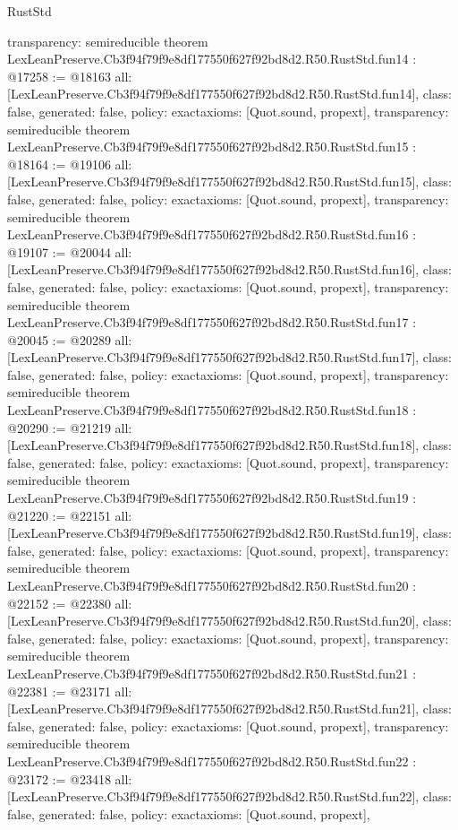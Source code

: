 \begin{lexlean}{RustStd}
\begin{coremodule}
{  transparency: semireducible
}
theorem LexLeanPreserve.Cb3f94f79f9e8df177550f627f92bd8d2.R50.RustStd.fun14 : @17258 := @18163 {
  all: [LexLeanPreserve.Cb3f94f79f9e8df177550f627f92bd8d2.R50.RustStd.fun14],
  class: false,
  generated: false,
  policy: exact{axioms: [Quot.sound, propext]},
  transparency: semireducible
}
theorem LexLeanPreserve.Cb3f94f79f9e8df177550f627f92bd8d2.R50.RustStd.fun15 : @18164 := @19106 {
  all: [LexLeanPreserve.Cb3f94f79f9e8df177550f627f92bd8d2.R50.RustStd.fun15],
  class: false,
  generated: false,
  policy: exact{axioms: [Quot.sound, propext]},
  transparency: semireducible
}
theorem LexLeanPreserve.Cb3f94f79f9e8df177550f627f92bd8d2.R50.RustStd.fun16 : @19107 := @20044 {
  all: [LexLeanPreserve.Cb3f94f79f9e8df177550f627f92bd8d2.R50.RustStd.fun16],
  class: false,
  generated: false,
  policy: exact{axioms: [Quot.sound, propext]},
  transparency: semireducible
}
theorem LexLeanPreserve.Cb3f94f79f9e8df177550f627f92bd8d2.R50.RustStd.fun17 : @20045 := @20289 {
  all: [LexLeanPreserve.Cb3f94f79f9e8df177550f627f92bd8d2.R50.RustStd.fun17],
  class: false,
  generated: false,
  policy: exact{axioms: [Quot.sound, propext]},
  transparency: semireducible
}
theorem LexLeanPreserve.Cb3f94f79f9e8df177550f627f92bd8d2.R50.RustStd.fun18 : @20290 := @21219 {
  all: [LexLeanPreserve.Cb3f94f79f9e8df177550f627f92bd8d2.R50.RustStd.fun18],
  class: false,
  generated: false,
  policy: exact{axioms: [Quot.sound, propext]},
  transparency: semireducible
}
theorem LexLeanPreserve.Cb3f94f79f9e8df177550f627f92bd8d2.R50.RustStd.fun19 : @21220 := @22151 {
  all: [LexLeanPreserve.Cb3f94f79f9e8df177550f627f92bd8d2.R50.RustStd.fun19],
  class: false,
  generated: false,
  policy: exact{axioms: [Quot.sound, propext]},
  transparency: semireducible
}
theorem LexLeanPreserve.Cb3f94f79f9e8df177550f627f92bd8d2.R50.RustStd.fun20 : @22152 := @22380 {
  all: [LexLeanPreserve.Cb3f94f79f9e8df177550f627f92bd8d2.R50.RustStd.fun20],
  class: false,
  generated: false,
  policy: exact{axioms: [Quot.sound, propext]},
  transparency: semireducible
}
theorem LexLeanPreserve.Cb3f94f79f9e8df177550f627f92bd8d2.R50.RustStd.fun21 : @22381 := @23171 {
  all: [LexLeanPreserve.Cb3f94f79f9e8df177550f627f92bd8d2.R50.RustStd.fun21],
  class: false,
  generated: false,
  policy: exact{axioms: [Quot.sound, propext]},
  transparency: semireducible
}
theorem LexLeanPreserve.Cb3f94f79f9e8df177550f627f92bd8d2.R50.RustStd.fun22 : @23172 := @23418 {
  all: [LexLeanPreserve.Cb3f94f79f9e8df177550f627f92bd8d2.R50.RustStd.fun22],
  class: false,
  generated: false,
  policy: exact{axioms: [Quot.sound, propext]},
}
\end{coremodule}
\end{lexlean}
